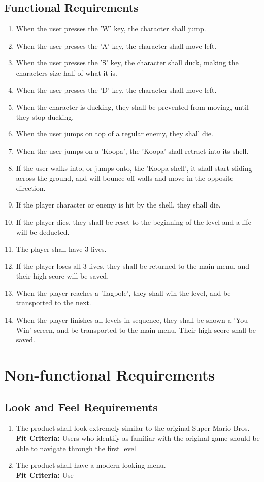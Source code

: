 \documentclass[12pt, titlepage]{article}
\begin{document}
\subsection{Functional Requirements}
\begin{enumerate}[{FR}1. ]
    \item When the user presses the 'W' key, the character shall jump.
    \item When the user presses the 'A' key, the character shall move left.
    \item When the user presses the 'S' key, the character shall duck, making the characters size half of what it is.
    \item When the user presses the 'D' key, the character shall move left.
    \item When the character is ducking, they shall be prevented from moving, until they stop ducking.
    \item When the user jumps on top of a regular enemy, they shall die.
    \item When the user jumps on a 'Koopa', the 'Koopa' shall retract into its shell.
    \item If the user walks into, or jumps onto, the 'Koopa shell', it shall start sliding across the ground, and will bounce off walls and move in the opposite direction.
    \item If the player character or enemy is hit by the shell, they shall die.
    \item If the player dies, they shall be reset to the beginning of the level and a life will be deducted.
    \item The player shall have 3 lives.
    \item If the player loses all 3 lives, they shall be returned to the main menu, and their high-score will be saved.
    \item When the player reaches a 'flagpole', they shall win the level, and be transported to the next.
    \item When the player finishes all levels in sequence, they shall be shown a 'You Win' screen, and be transported to the main menu. Their high-score shall be saved.
\end{enumerate}
\section{Non-functional Requirements}

\subsection{Look and Feel Requirements}
\begin{enumerate}[{LF}1. ]
    \item The product shall look extremely similar to the original Super Mario Bros.\\
    \textbf{Fit Criteria:} Users who identify as familiar with the original game should be able to navigate through the first level
    \item The product shall have a modern looking menu.\\
    \textbf{Fit Criteria:} Use
\end{enumerate}
\end{document}
